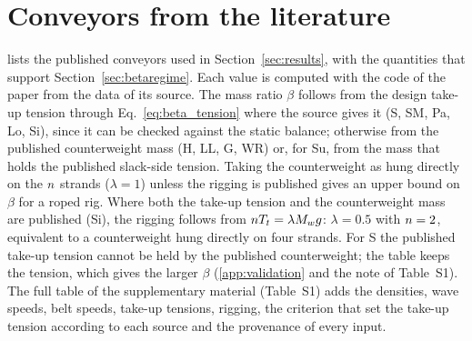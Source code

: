 \section{Conveyors from the literature}\label{app:cases}

 lists the published conveyors used in Section~\ref{sec:results}, with the
quantities that support Section~\ref{sec:betaregime}. Each value is computed with the code of the
paper from the data of its source. The mass ratio $\beta$ follows from the design take-up tension
through Eq.~\eqref{eq:beta_tension} where the source gives it (S, SM, Pa, Lo, Si), since it can be
checked against the static balance; otherwise from the published counterweight mass (H, LL, G,
WR) or, for Su, from the mass that holds the published slack-side tension. Taking the
counterweight as hung directly on the $n$ strands ($\lambda=1$) unless the rigging is
published gives an upper bound on $\beta$ for a roped rig. Where both the take-up tension and the
counterweight mass are published (Si), the rigging follows from $nT_t=\lambda M_wg$:
$\lambda=0.5$ with $n=2$, equivalent to a counterweight hung directly on four strands. For S
the published take-up tension cannot be held by the published counterweight; the table keeps the
tension, which gives the larger $\beta$ (\cref{app:validation} and the note of Table~S1). The full table of the supplementary material
(Table~S1) adds the densities, wave speeds, belt speeds, take-up tensions, rigging, the criterion
that set the take-up tension according to each source and the provenance of every input.


